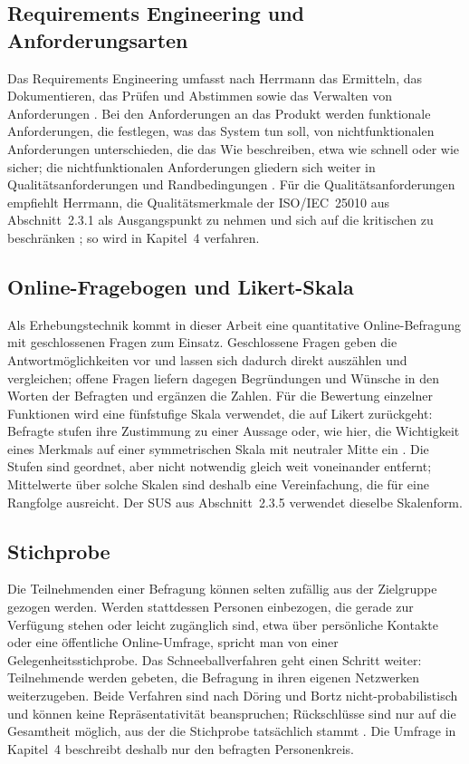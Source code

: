\documentclass[12pt,a4paper]{scrreprt}
\begin{document}
\subsection{Requirements Engineering und Anforderungsarten}
Das Requirements Engineering umfasst nach Herrmann das Ermitteln, das Dokumentieren, das Prüfen und Abstimmen sowie das Verwalten von Anforderungen \cite[Abschn.~1.3]{herrmann2022}. Bei den Anforderungen an das Produkt werden funktionale Anforderungen, die festlegen, was das System tun soll, von nichtfunktionalen Anforderungen unterschieden, die das Wie beschreiben, etwa wie schnell oder wie sicher; die nichtfunktionalen Anforderungen gliedern sich weiter in Qualitätsanforderungen und Randbedingungen \cite[Abschn.~5.4]{herrmann2022}. Für die Qualitätsanforderungen empfiehlt Herrmann, die Qualitätsmerkmale der ISO/IEC~25010 aus Abschnitt~2.3.1 als Ausgangspunkt zu nehmen und sich auf die kritischen zu beschränken \cite[Abschn.~5.7.4]{herrmann2022}; so wird in Kapitel~4 verfahren.

\subsection{Online-Fragebogen und Likert-Skala}
Als Erhebungstechnik kommt in dieser Arbeit eine quantitative Online-Befragung mit geschlossenen Fragen zum Einsatz. Geschlossene Fragen geben die Antwortmöglichkeiten vor und lassen sich dadurch direkt auszählen und vergleichen; offene Fragen liefern dagegen Begründungen und Wünsche in den Worten der Befragten und ergänzen die Zahlen. Für die Bewertung einzelner Funktionen wird eine fünfstufige Skala verwendet, die auf Likert zurückgeht: Befragte stufen ihre Zustimmung zu einer Aussage oder, wie hier, die Wichtigkeit eines Merkmals auf einer symmetrischen Skala mit neutraler Mitte ein \cite{likert1932}. Die Stufen sind geordnet, aber nicht notwendig gleich weit voneinander entfernt; Mittelwerte über solche Skalen sind deshalb eine Vereinfachung, die für eine Rangfolge ausreicht. Der SUS aus Abschnitt~2.3.5 verwendet dieselbe Skalenform.

\subsection{Stichprobe}
Die Teilnehmenden einer Befragung können selten zufällig aus der Zielgruppe gezogen werden. Werden stattdessen Personen einbezogen, die gerade zur Verfügung stehen oder leicht zugänglich sind, etwa über persönliche Kontakte oder eine öffentliche Online-Umfrage, spricht man von einer Gelegenheitsstichprobe. Das Schneeballverfahren geht einen Schritt weiter: Teilnehmende werden gebeten, die Befragung in ihren eigenen Netzwerken weiterzugeben. Beide Verfahren sind nach Döring und Bortz nicht-probabilistisch und können keine Repräsentativität beanspruchen; Rückschlüsse sind nur auf die Gesamtheit möglich, aus der die Stichprobe tatsächlich stammt \cite[Abschn.~9.3.1]{doering2016}. Die Umfrage in Kapitel~4 beschreibt deshalb nur den befragten Personenkreis.
\end{document}

